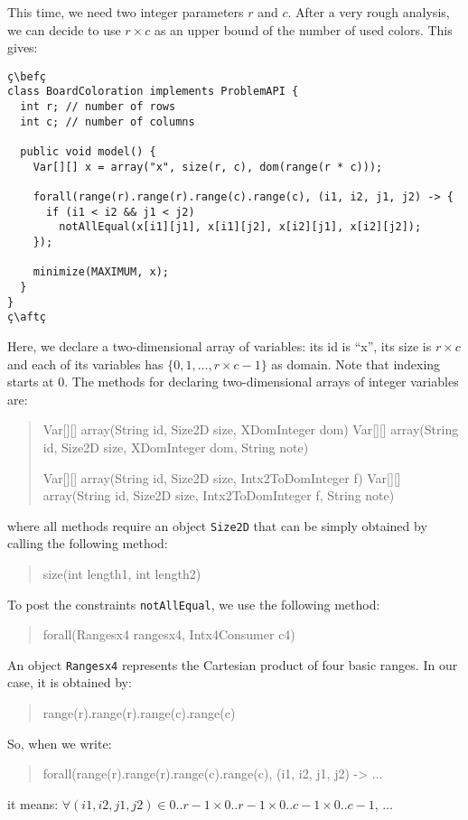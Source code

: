 \documentclass[10pt]{article}
\newcommand{\gb}[1]{{\tt #1}} %
\newcommand{\nn}[1]{{\tt #1}} %
\newenvironment{myvb}{\endgraf\small\verbatim}{\endverbatim}
\def\bef{\rule{10cm}{0.1mm}} %
\def\aft{\rule{10cm}{0.1mm}\medskip}
\begin{document}
This time, we need two integer parameters $r$ and $c$.
After a very rough analysis, we can decide to use $r \times c$ as an upper bound of the number of used colors. 
This gives:


\begin{lstlisting}
ç\befç
class BoardColoration implements ProblemAPI {
  int r; // number of rows 
  int c; // number of columns

  public void model() {
    Var[][] x = array("x", size(r, c), dom(range(r * c)));
    
    forall(range(r).range(r).range(c).range(c), (i1, i2, j1, j2) -> {
      if (i1 < i2 && j1 < j2)
        notAllEqual(x[i1][j1], x[i1][j2], x[i2][j1], x[i2][j2]);
    });
    
    minimize(MAXIMUM, x);
  }
}
ç\aftç
\end{lstlisting}

Here, we declare a two-dimensional array of variables: its id is ``x'', its size is $r \times c$ and each of its variables has $\{0,1,\dots,r\times c-1\}$ as domain.
Note that indexing starts at 0.
The methods for declaring two-dimensional arrays of integer variables are:

\begin{quote}
\begin{myvb}
Var[][] array(String id, Size2D size, XDomInteger dom)
Var[][] array(String id, Size2D size, XDomInteger dom, String note)

Var[][] array(String id, Size2D size, Intx2ToDomInteger f)
Var[][] array(String id, Size2D size, Intx2ToDomInteger f, String note) 
\end{myvb}
\end{quote}

where all methods require an object \nn{Size2D} that can be simply obtained by calling the following method:
\begin{quote}
\begin{myvb}
size(int length1, int length2)
\end{myvb}
\end{quote}

To post the constraints \gb{notAllEqual}, we use the following method:

\begin{quote}
\begin{myvb}
forall(Rangesx4 rangesx4, Intx4Consumer c4) 
\end{myvb}
\end{quote}

An object \nn{Rangesx4} represents the Cartesian product of four basic ranges. In our case, it is obtained by:
\begin{quote}
\begin{myvb}
range(r).range(r).range(c).range(c)
\end{myvb}
\end{quote}
So, when we write:
\begin{quote}
\begin{myvb}
forall(range(r).range(r).range(c).range(c), (i1, i2, j1, j2) -> ...
\end{myvb}
\end{quote}
it means: $\forall (i1,i2,j1,j2) \in 0..r-1 \times 0..r-1 \times 0..c-1 \times 0..c-1$, $\dots$
\end{document}
